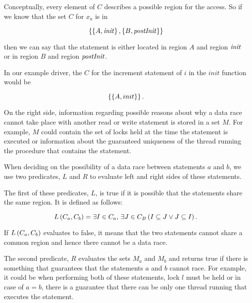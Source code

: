 \documentclass[..thesis.tex]{subfiles}
\begin{document}
Conceptually, every element of $C$ describes a possible region for the access. So if we know that the set $C$ for $x_{a}$ is in
   
\begin{equation*}
\left\lbrace \left\lbrace A, \mathit{init} \right\rbrace, \left\lbrace B, \mathit{postInit} \right\rbrace \right\rbrace 
\end{equation*}

then we can say that the statement is either located in region $A$ and region $\mathit{init}$ or in region $B$ and region $\mathit{postInit}$. 

In our example driver, the $C$ for the increment statement of $i$ in the $init$ function would be 

\begin{equation*}
\left\lbrace \left\lbrace A, init \right\rbrace \right\rbrace \text{.}
\end{equation*} 

On the right side, information regarding possible reasons about why a data race cannot take place with another read or write statement is stored in a set $M$.
For example, $M$ could contain the set of locks held at the time the statement is executed or information about the guaranteed uniqueness of the thread running the procedure that contains the statement.

When deciding on the possibility of a data race between statements $a$ and $b$, we use two predicates, $L$ and $R$ to evaluate left and right sides of these statements. 


The first of these predicates, $L$, is true if it is possible that the statements share the same region. It is defined as follows:

\begin{equation*}
L \left( C_a, C_b \right) = \exists I \in C_a,\, \exists J \in C_B  \left( I \subseteq J \lor J \subseteq I \right) \text{.}
\end{equation*}

If $L \left( C_a, C_b \right)$ evaluates to false, it means that the two statements cannot share a common region and hence there cannot be a data race. 

The second predicate, $R$ evaluates the sets $M_a$ and $M_b$ and returns true if there is something that guarantees that the statements $a$ and $b$ cannot race.
For example, it could be when performing both of these statements, lock $l$ must be held or in case of $a=b$,
there is a guarantee that there can be only one thread running that executes the statement.
\end{document}
